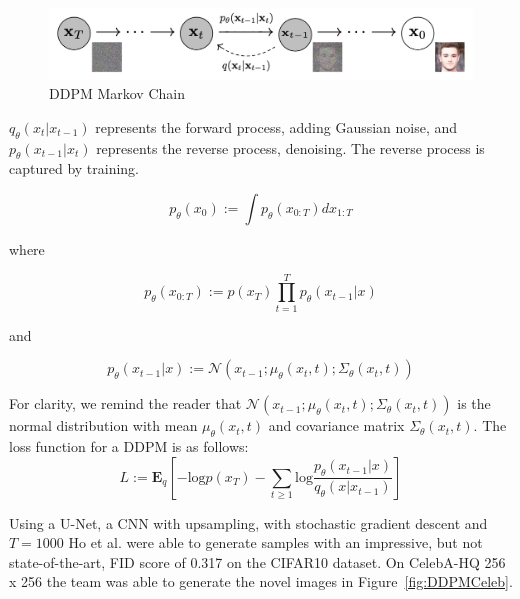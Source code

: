 \documentclass[%
 reprint,
 amsmath,amssymb,
 aps,
]{revtex4-2}
\begin{document}
\begin{figure}[h]
    \includegraphics[width=0.9\columnwidth]{ddpm.png}
    \caption{\label{fig:vae}DDPM Markov Chain \cite{ho2020denoising}}
\end{figure}


$q_\theta(x_t|x_{t-1} )$  represents the forward process, adding Gaussian noise, and $p_\theta(x_{t-1}|x_t )$ represents the reverse process, denoising. The reverse process is captured by training.

\begin{equation}
p_\theta(x_0) :=\int p_\theta(x_{0:T} ) dx_{1:T}
\end{equation}

where

\begin{equation}
p_\theta(x_{0:T}) := p(x_T)\prod_{t=1}^{T} p_\theta(x_{t-1}|x)
\end{equation}

and

\begin{equation}
p_\theta(x_{t-1}|x) := \mathcal{N}(x_{t-1};\mu_\theta(x_t,t); \Sigma_\theta(x_t,t))
\end{equation}

For clarity, we remind the reader that $\mathcal{N}(x_{t-1};\mu_\theta(x_t,t); \Sigma_\theta(x_t,t))$ is the normal distribution with mean $\mu_\theta(x_t,t)$ and covariance matrix $\Sigma_\theta(x_t,t)$. The loss function for a DDPM is as follows:
\begin{equation}
L := \mathbf{E}_q[-\mathrm{log} p(x_T) - \sum_{t\ge1}\mathrm{log} \frac{p_\theta(x_{t-1}|x )}{q_\theta(x|x_{t-1} )}]
\end{equation}


Using a U-Net, a CNN with upsampling, with stochastic gradient descent and $T=1000$ Ho et al. were able to generate samples with an impressive, but not state-of-the-art, FID score of 0.317 on the CIFAR10 dataset. On CelebA-HQ 256 x 256 the team was able to generate the novel images in Figure~\ref{fig:DDPMCeleb}.
\end{document}
